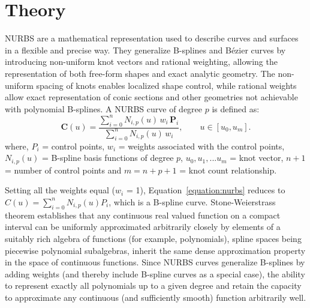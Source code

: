 \documentclass[11pt]{article}
\begin{document}
\section{Theory}
NURBS \cite{nurbs} are a mathematical representation used to describe curves and surfaces 
in a flexible and precise way. They generalize B-splines and Bézier \cite{Prautzsch2002Bezier} curves 
by introducing non-uniform knot vectors and rational weighting, 
allowing the representation of both free-form shapes and 
exact analytic geometry. The non-uniform spacing of knots enables localized shape control, 
while rational weights allow exact representation of conic sections 
and other geometries not achievable with polynomial B-splines.
A NURBS curve of degree $p$ is defined as:
\begin{equation}\label{equation:nurbs}
\mathbf{C}(u)=
\frac{
\displaystyle\sum_{i=0}^{n} N_{i,p}(u)\, w_i\, \mathbf{P}_i
}{
\displaystyle\sum_{i=0}^{n} N_{i,p}(u)\, w_i
},
\qquad u \in [u_0, u_m].
\end{equation}
where, $P_i$ = control points, $w_i$ = weights associated with the control points, 
$N_{i,p}(u)$ = B-spline basis functions of degree $p$, ${u_0, u_1,...u_m}$ = knot vector, 
$n + 1$ = number of control points and $m = n + p + 1$ = knot count relationship.

Setting all the weights equal ($w_i$ = 1), Equation~\ref{equation:nurbs} reduces to 
$C(u) = \displaystyle\sum_{i=0}^{n} N_{i,p}(u)P_i$, which is a B-spline curve.
Stone-Weierstrass theorem \cite{stone1948generalized} establishes that any continuous real valued 
function on a compact interval can be uniformly approximated arbitrarily 
closely by elements of a suitably rich algebra of functions 
(for example, polynomials), spline spaces being piecewise polynomial 
subalgebras, inherit the same dense approximation property 
in the space of continuous functions. Since NURBS curves 
generalize B-splines by adding weights 
(and thereby include B-spline curves as a special case), the ability to represent exactly all 
polynomials up to a given degree and retain the capacity to approximate any 
continuous (and sufficiently smooth) function arbitrarily well.
\end{document}
